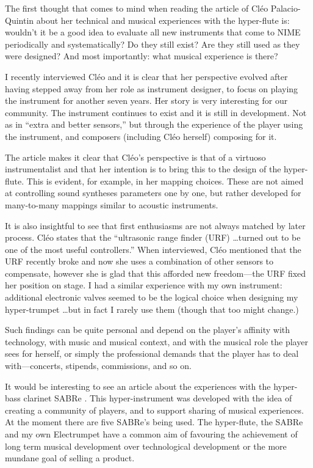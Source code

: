 The first thought that comes to mind when reading the article of Cl\'{e}o Palacio-Quintin about her technical and musical experiences with the hyper-flute is: wouldn't it be a good idea to evaluate all new instruments that come to NIME periodically and systematically? Do they still exist? Are they still used as they were designed? And most importantly: what musical experience is there?

I recently interviewed Cl\'{e}o and it is clear that her perspective evolved after having stepped away from her role as instrument designer, to focus on playing the instrument for another seven years. Her story is very interesting for our community. The instrument continues to exist and it is still in development. Not as in ``extra and better sensors,'' but through the experience of the player using the instrument, and composers (including Cl\'{e}o herself) composing for it.

The article makes it clear that Cl\'{e}o's perspective is that of a virtuoso instrumentalist and that her intention is to bring this to the design of the hyper-flute. This is evident, for example, in her mapping choices. These are not aimed at controlling sound syntheses parameters one by one, but rather developed for many-to-many mappings similar to acoustic instruments.

It is also insightful to see that first enthusiasms are not always matched by later process. Cl\'{e}o states that the ``ultrasonic range finder (URF) \ldots turned out to be one of the most useful controllers.'' When interviewed, Cl\'{e}o mentioned that the URF recently broke and now she uses a combination of other sensors to compensate, however she is glad that this afforded new freedom---the URF fixed her position on stage. I had a similar experience with my own instrument: additional electronic valves seemed to be the logical choice when designing my hyper-trumpet \ldots but in fact I rarely use them (though that too might change.)

Such findings can be quite personal and depend on the player's affinity with technology, with music and musical context, and with the musical role the player sees for herself, or simply the professional demands that the player has to deal with---concerts, stipends, commissions, and so on.

It would be interesting to see an article about the experiences with the hyper-bass clarinet SABRe \cite{Schiesser:2012}. This hyper-instrument was developed with the idea of creating a community of players,  and to support sharing of musical experiences. At the moment there are five SABRe's being used. The hyper-flute, the SABRe and my own Electrumpet \cite{Leeuw:2012a} have a common aim of  favouring the achievement of  long term musical development over technological development or the more mundane goal of selling a product.

